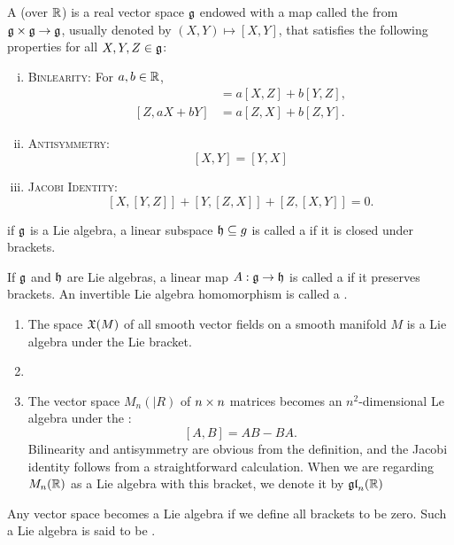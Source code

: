\dfn A  (over $\mathbb{R}$) is a real vector space $\mathfrak{g}$ endowed with a map called the  from $\mathfrak{g}\times\mathfrak{g}\rightarrow\mathfrak{g}$, usually denoted by $(X,Y)\mapsto[X,Y]$, that satisfies the following properties for all $X,Y,Z\in \mathfrak{g}$:
\begin{enumerate}[(i)]
    \item {\scshape Binlearity:} For $a,b\in \mathbb{R}$,
    \begin{align*}
        [aX + bY, Z] &= a[X,Z] + b[Y,Z],\\
        [Z, aX + bY] &= a[Z,X] + b[Z,Y].
    \end{align*}
    \item {\scshape Antisymmetry:}
    \[[X,Y] = [Y,X]\]
    \item {\scshape Jacobi Identity:}
    \[[X,[Y,Z]] + [Y,[Z,X]] + [Z,[X,Y]] = 0.\]
\end{enumerate}

\dfn if $\mathfrak{g}$ is a Lie algebra, a linear subspace $\mathfrak{h}\subseteq g$ is called a  if it is closed under brackets.

\dfn If $\mathfrak{g}$ and $\mathfrak{h}$ are Lie algebras, a linear map $A:\mathfrak{g} \rightarrow \mathfrak{h}$ is called a  if it preserves brackets. An invertible Lie algebra homomorphism is called a .

\setcounter{thm}{35}

\begin{ex}\nl
\begin{enumerate}
    \item The space $\mathfrak{X}(M)$ of all smooth vector fields on a smooth manifold $M$ is a Lie algebra under the Lie bracket.
    \item {}
    \item The vector space $M_n(|R)$ of $n\times n$ matrices becomes an $n^2$-dimensional Le algebra under the :
    \[[A,B] = AB - BA.\]
    Bilinearity and antisymmetry are obvious from the definition, and the Jacobi identity follows from a straightforward calculation. When we are regarding $M_n(\mathbb{R})$ as a Lie algebra with this bracket, we denote it by $\mathfrak{gl}_n(\mathbb{R})$
\end{enumerate}
\end{ex}

\dfn Any vector space becomes a Lie algebra if we define all brackets to be zero. Such a Lie algebra is said to be .


